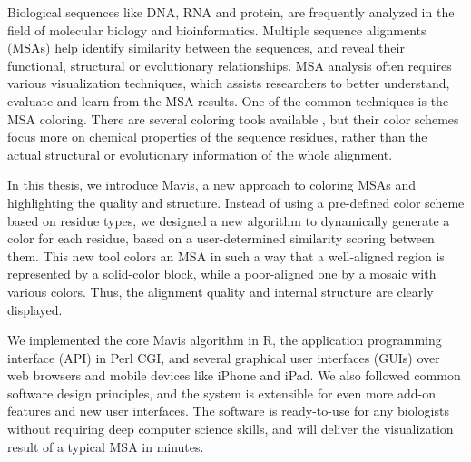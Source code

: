 Biological sequences like DNA, RNA and protein, are frequently analyzed in the field of molecular biology and bioinformatics. Multiple sequence alignments (MSAs) help identify similarity between the sequences, and reveal their functional, structural or evolutionary relationships. MSA analysis often requires various visualization techniques, which assists researchers to better understand, evaluate and learn from the MSA results. One of the common techniques is the MSA coloring. There are several coloring tools available \cite{Procter2010aa}, but their color schemes focus more on chemical properties of the sequence residues, rather than the actual structural or evolutionary information of the whole alignment.

In this thesis, we introduce Mavis, a new approach to coloring MSAs and highlighting the quality and structure. Instead of using a pre-defined color scheme based on residue types, we designed a new algorithm to dynamically generate a color for each residue, based on a user-determined similarity scoring between them. This new tool colors an MSA in such a way that a well-aligned region is represented by a solid-color block, while a poor-aligned one by a mosaic with various colors. Thus, the alignment quality and internal structure are clearly displayed.

We implemented the core Mavis algorithm in R, the application programming interface (API) in Perl CGI, and several graphical user interfaces (GUIs) over web browsers and mobile devices like iPhone and iPad. We also followed common software design principles, and the system is extensible for even more add-on features and new user interfaces. The software is ready-to-use for any biologists without requiring deep computer science skills, and will deliver the visualization result of a typical MSA in minutes.